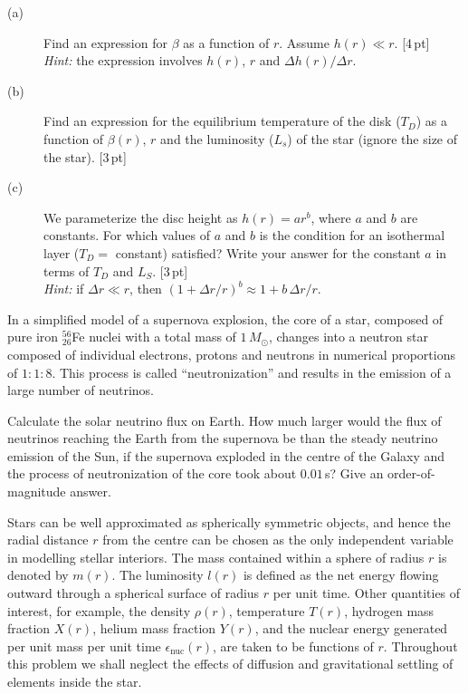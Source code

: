 \begin{description}
\item[(a)] Find an expression for $\beta$ as a function of $r$. Assume
  $h(r) \ll r$. \hfill[4\,pt]\\
  \textit{Hint:} the expression involves $h(r)$, $r$ and $\Delta h(r)/\Delta r$.
\item[(b)] Find an expression for the equilibrium temperature of the disk
  ($T_D$) as a function of $\beta(r)$, $r$ and the luminosity ($L_s$) of the star
  (ignore the size of the star). \hfill[3\,pt]
\item[(c)] We parameterize the disc height as $h(r) = a r^b$, where $a$ and $b$
  are constants. For which values of $a$ and $b$ is the condition for an
  isothermal layer ($T_D = $ constant) satisfied? Write your answer for the
  constant $a$ in terms of $T_D$ and $L_S$. \hfill[3\,pt]\\
  \textit{Hint:} if $\Delta r \ll r$, then
  $(1 + \Delta r/r)^b \approx 1 + b\,\Delta r/r$.
\end{description}

In a simplified model of a supernova explosion, the core of a star, composed of
pure iron $^{56}_{26}$Fe nuclei with a total mass of $1\,M_\odot$, changes into a
neutron star composed of individual electrons, protons and neutrons in numerical
proportions of $1:1:8$. This process is called ``neutronization'' and results in
the emission of a large number of neutrinos.

Calculate the solar neutrino flux on Earth. How much larger would the flux of
neutrinos reaching the Earth from the supernova be than the steady neutrino
emission of the Sun, if the supernova exploded in the centre of the Galaxy and
the process of neutronization of the core took about $0.01$\,s? Give an
order-of-magnitude answer.

Stars can be well approximated as spherically symmetric objects, and hence the
radial distance $r$ from the centre can be chosen as the only independent
variable in modelling stellar interiors. The mass contained within a sphere of
radius $r$ is denoted by $m(r)$. The luminosity $l(r)$ is defined as the net
energy flowing outward through a spherical surface of radius $r$ per unit time.
Other quantities of interest, for example, the density $\rho(r)$, temperature
$T(r)$, hydrogen mass fraction $X(r)$, helium mass fraction $Y(r)$, and the
nuclear energy generated per unit mass per unit time
$\epsilon_{\mathrm{nuc}}(r)$, are taken to be functions of $r$. Throughout this
problem we shall neglect the effects of diffusion and gravitational settling of
elements inside the star.

